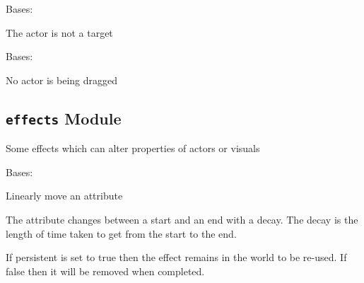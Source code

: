 \documentclass[letterpaper,10pt,english]{sphinxmanual}
\begin{document}
\begin{fulllineitems}
\label{blocks:serge.blocks.dragndrop.NotATarget}
Bases: 

The actor is not a target

\end{fulllineitems}


\begin{fulllineitems}
\label{blocks:serge.blocks.dragndrop.NotDragging}
Bases: 

No actor is being dragged

\end{fulllineitems}



\subsection{\texttt{effects} Module}
\label{blocks:module-serge.blocks.effects}\label{blocks:effects-module}
Some effects which can alter properties of actors or visuals

\begin{fulllineitems}
\label{blocks:serge.blocks.effects.AttributeFade}
Bases: {\hyperref[blocks:serge.blocks.effects.MethodCallFade]{}}

Linearly move an attribute

The attribute changes between a start and an end with a decay.
The decay is the length of time taken to get from the start to the end.

If persistent is set to true then the effect remains in the world to be
re-used. If false then it will be removed when completed.

\end{fulllineitems}

\end{document}
